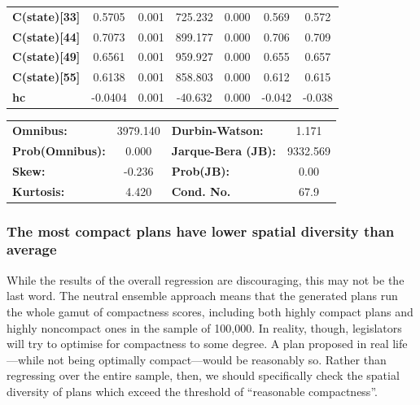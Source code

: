 \documentclass[]{article}
\begin{document}
\begin{table}[h!]
\begin{center}
\begin{tabular}{lcccccc}
\textbf{C(state)[33]} &       0.5705  &        0.001     &   725.232  &         0.000        &        0.569    &        0.572     \\
\textbf{C(state)[44]} &       0.7073  &        0.001     &   899.177  &         0.000        &        0.706    &        0.709     \\
\textbf{C(state)[49]} &       0.6561  &        0.001     &   959.927  &         0.000        &        0.655    &        0.657     \\
\textbf{C(state)[55]} &       0.6138  &        0.001     &   858.803  &         0.000        &        0.612    &        0.615     \\
\textbf{hc}           &      -0.0404  &        0.001     &   -40.632  &         0.000        &       -0.042    &       -0.038     \\
\bottomrule
\end{tabular}
\begin{tabular}{lclc}
\textbf{Omnibus:}       & 3979.140 & \textbf{  Durbin-Watson:     } &    1.171  \\
\textbf{Prob(Omnibus):} &   0.000  & \textbf{  Jarque-Bera (JB):  } & 9332.569  \\
\textbf{Skew:}          &  -0.236  & \textbf{  Prob(JB):          } &     0.00  \\
\textbf{Kurtosis:}      &   4.420  & \textbf{  Cond. No.          } &     67.9  \\
\bottomrule
\end{tabular}
\end{center}
\end{table}

\hypertarget{the-most-compact-plans-have-lower-spatial-diversity-than-average}{%
\subsubsection{The most compact plans have lower spatial diversity than
average}\label{the-most-compact-plans-have-lower-spatial-diversity-than-average}}

While the results of the overall regression are discouraging, this may
not be the last word. The neutral ensemble approach means that the
generated plans run the whole gamut of compactness scores, including
both highly compact plans and highly noncompact ones in the sample of
100,000. In reality, though, legislators will try to optimise for
compactness to some degree. A plan proposed in real life---while not
being optimally compact---would be reasonably so. Rather than regressing
over the entire sample, then, we should specifically check the spatial
diversity of plans which exceed the threshold of ``reasonable
compactness''.
\end{document}
